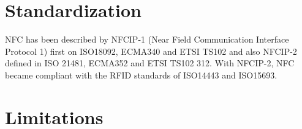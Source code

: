\section{Standardization}
NFC has been described by NFCIP-1 (Near Field Communication Interface Protocol 1) first on ISO18092, ECMA340 and ETSI TS102 and also NFCIP-2 defined in ISO 21481, ECMA352 and ETSI TS102 312.
With NFCIP-2, NFC became compliant with the RFID standards of ISO14443 and ISO15693.

\section{Limitations}






